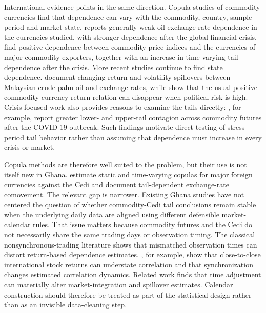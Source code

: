 International evidence points in the same direction. Copula studies of commodity currencies find that dependence can vary with the commodity, country, sample period and market state. \citet{reboredo2012} reports generally weak oil-exchange-rate dependence in the currencies studied, with stronger dependence after the global financial crisis. \citet{ignatieva2017} find positive dependence between commodity-price indices and the currencies of major commodity exporters, together with an increase in time-varying tail dependence after the crisis. More recent studies continue to find state dependence. \citet{go2024} document changing return and volatility spillovers between Malaysian crude palm oil and exchange rates, while \citet{dodd2026} show that the usual positive commodity-currency return relation can disappear when political risk is high. Crisis-focused work also provides reasons to examine the tails directly: \citet{qiao2023}, for example, report greater lower- and upper-tail contagion across commodity futures after the COVID-19 outbreak. Such findings motivate direct testing of stress-period tail behavior rather than assuming that dependence must increase in every crisis or market.

Copula methods are therefore well suited to the problem, but their use is not itself new in Ghana. \citet{mensah2020} estimate static and time-varying copulas for major foreign currencies against the Cedi and document tail-dependent exchange-rate comovement. The relevant gap is narrower. Existing Ghana studies have not centered the question of whether commodity-Cedi tail conclusions remain stable when the underlying daily data are aligned using different defensible market-calendar rules. That issue matters because commodity futures and the Cedi do not necessarily share the same trading days or observation timing. The classical nonsynchronous-trading literature shows that mismatched observation times can distort return-based dependence estimates. \citet{martens2001}, for example, show that close-to-close international stock returns can understate correlation and that synchronization changes estimated correlation dynamics. Related work finds that time adjustment can materially alter market-integration and spillover estimates. Calendar construction should therefore be treated as part of the statistical design rather than as an invisible data-cleaning step.

